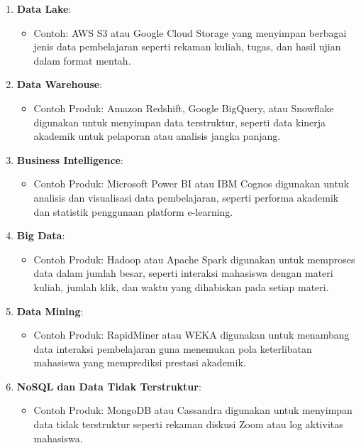 \begin{enumerate}
	\item \textbf{Data Lake}: 
	\begin{itemize}
		\item Contoh: AWS S3 atau Google Cloud Storage yang menyimpan berbagai jenis data pembelajaran seperti rekaman kuliah, tugas, dan hasil ujian dalam format mentah.
	\end{itemize}
	
	\item \textbf{Data Warehouse}: 
	\begin{itemize}
		\item Contoh Produk: Amazon Redshift, Google BigQuery, atau Snowflake digunakan untuk menyimpan data terstruktur, seperti data kinerja akademik untuk pelaporan atau analisis jangka panjang.
	\end{itemize}
	
	\item \textbf{Business Intelligence}: 
	\begin{itemize}
		\item Contoh Produk: Microsoft Power BI atau IBM Cognos digunakan untuk analisis dan visualisasi data pembelajaran, seperti performa akademik dan statistik penggunaan platform e-learning.
	\end{itemize}
	
	\item \textbf{Big Data}: 
	\begin{itemize}
		\item Contoh Produk: Hadoop atau Apache Spark digunakan untuk memproses data dalam jumlah besar, seperti interaksi mahasiswa dengan materi kuliah, jumlah klik, dan waktu yang dihabiskan pada setiap materi.
	\end{itemize}
	
	\item \textbf{Data Mining}: 
	\begin{itemize}
		\item Contoh Produk: RapidMiner atau WEKA digunakan untuk menambang data interaksi pembelajaran guna menemukan pola keterlibatan mahasiswa yang memprediksi prestasi akademik.
	\end{itemize}
	
	\item \textbf{NoSQL dan Data Tidak Terstruktur}: 
	\begin{itemize}
		\item Contoh Produk: MongoDB atau Cassandra digunakan untuk menyimpan data tidak terstruktur seperti rekaman diskusi Zoom atau log aktivitas mahasiswa.
	\end{itemize}
	

\end{enumerate}
